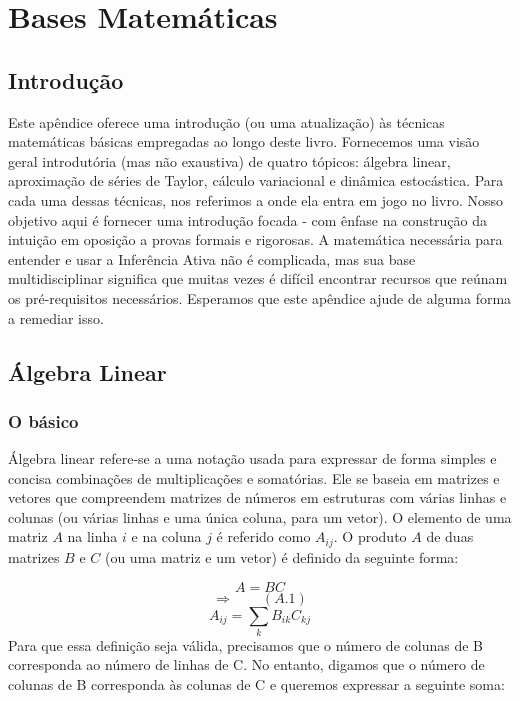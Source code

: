 \documentclass[
  12pt,
]{book}
\begin{document}
\hypertarget{appendix-apuxeandice}{%
\appendix}


\hypertarget{bases-matemuxe1ticas}{%
\chapter{Bases Matemáticas}\label{bases-matemuxe1ticas}}

\hypertarget{introduuxe7uxe3o-10}{%
\section{Introdução}\label{introduuxe7uxe3o-10}}

Este apêndice oferece uma introdução (ou uma atualização) às técnicas matemáticas básicas empregadas ao longo deste livro. Fornecemos uma visão geral introdutória (mas não exaustiva) de quatro tópicos: álgebra linear, aproximação de séries de Taylor, cálculo variacional e dinâmica estocástica. Para cada uma dessas técnicas, nos referimos a onde ela entra em jogo no livro. Nosso objetivo aqui é fornecer uma introdução focada - com ênfase na construção da intuição em oposição a provas formais e rigorosas. A matemática necessária para entender e usar a Inferência Ativa não é complicada, mas sua base multidisciplinar significa que muitas vezes é difícil encontrar recursos que reúnam os pré-requisitos necessários. Esperamos que este apêndice ajude de alguma forma a remediar isso.

\hypertarget{uxe1lgebra-linear}{%
\section{Álgebra Linear}\label{uxe1lgebra-linear}}

\hypertarget{o-buxe1sico}{%
\subsection{O básico}\label{o-buxe1sico}}

Álgebra linear refere-se a uma notação usada para expressar de forma simples e concisa combinações de multiplicações e somatórias. Ele se baseia em matrizes e vetores que compreendem matrizes de números em estruturas com várias linhas e colunas (ou várias linhas e uma única coluna, para um vetor). O elemento de uma matriz \(A\) na linha \(i\) e na coluna \(j\) é referido como \(A_{ij}\). O produto \(A\) de duas matrizes \(B\) e \(C\) (ou uma matriz e um vetor) é definido da seguinte forma:

\[ A = BC \]
\[\Longrightarrow \qquad (A.1)\]
\[ A_{ij} = \sum_k B_{ik} C_{kj} \]
Para que essa definição seja válida, precisamos que o número de colunas de B corresponda ao número de linhas de C. No entanto, digamos que o número de colunas de B corresponda às colunas de C e queremos expressar a seguinte soma:
\end{document}
